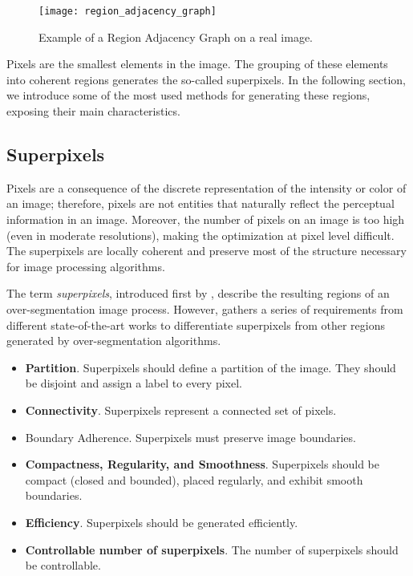 \begin{figure}[!ht]
	\centering
	\texttt{[image: region\_adjacency\_graph]}       	    
    \caption{Example of a Region Adjacency Graph on a real image.}
    \label{fig:region_adjacency_graph}    
\end{figure}


Pixels are the smallest elements in the image. The grouping of these elements into coherent regions generates the so-called superpixels. In the following section, we introduce some of the most used methods for generating these regions, exposing their main characteristics.


\subsection{Superpixels}

Pixels are a consequence of the discrete representation of the intensity or color of an image; therefore, pixels are not entities that naturally reflect the perceptual information in an image. Moreover, the number of pixels on an image is too high (even in moderate resolutions), making the optimization at pixel level difficult. The superpixels are locally coherent and preserve most of the structure necessary for image processing algorithms.

The term \textit{superpixels}, introduced first by \cite{Ren.Malik:ICCV:2003}, describe the resulting regions of an over-segmentation image process. However,  \cite{Stutz.Hermans.ea:CVIU:2018} gathers a series of requirements from different state-of-the-art works to differentiate superpixels from other regions generated by over-segmentation algorithms. 

\begin{itemize}
 \item \textbf{Partition}. Superpixels should define a partition of the image. They should be disjoint and assign a label to every pixel.
 \item \textbf{Connectivity}. Superpixels represent a connected set of pixels.
 \item Boundary Adherence. Superpixels must preserve image boundaries.
 \item \textbf{Compactness, Regularity, and Smoothness}. Superpixels should be compact (closed and bounded), placed regularly, and exhibit smooth boundaries.
 \item \textbf{Efficiency}. Superpixels should be generated efficiently.

 \item \textbf{Controllable number of superpixels}. The number of superpixels should be controllable.
\end{itemize}

